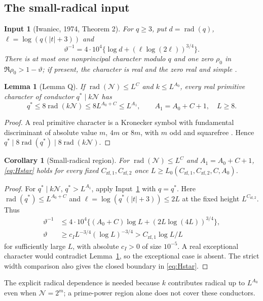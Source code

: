 \documentclass[11pt]{article}
\newtheorem{lemma}[theorem]{Lemma}
\newtheorem{corollary}[theorem]{Corollary}
\newtheorem{inputthm}[theorem]{Input}
\theoremstyle{definition}
\DeclareMathOperator{\rad}{rad}
\newcommand{\GN}{\mathcal N}
\theoremstyle{remark}
\numberwithin{equation}{section}
\begin{document}
\subsection{The small-radical input}\label{subsec:radical}
\begin{inputthm}[Iwaniec, 1974, Theorem 2]\label{input:I}
For $q\ge3$, put $d=\rad(q)$,
$\ell=\log(q(|t|+3))$ and
\begin{equation}\label{eq:Iwaniec}
 \vartheta^{-1}=4\cdot10^4
       \{\log d+(\ell\log(2\ell))^{3/4}\}.
\end{equation}
There is at most one nonprincipal character modulo $q$ and one
zero $\rho_0$ in $\Re\rho_0>1-\vartheta$; if present, the
character is real and the zero real and simple
\cite[Theorem~2, p.~97]{Iwaniec1974}.
\end{inputthm}
\begin{lemma}[Lemma Q]\label{lem:Q}
If $\rad(\GN)\le L^C$ and $k\le L^{A_0}$, every real primitive
character of conductor $q^*\mid k\GN$ has
\begin{equation}\label{eq:Q}
 q^*\le8\rad(k\GN)\le8L^{A_0+C}\le L^{A_1},
 \qquad A_1=A_0+C+1,\quad L\ge8.
\end{equation}
\end{lemma}
\begin{proof}
A real primitive character is a Kronecker symbol with fundamental
discriminant of absolute value $m$, $4m$ or $8m$, with $m$ odd and
squarefree \cite[Chapter~5]{Davenport}. Hence
$q^*\mid8\rad(q^*)\mid8\rad(k\GN)$.
\end{proof}
\begin{corollary}[Small-radical region]\label{cor:small-radical}
For $\rad(\GN)\le L^C$ and $A_1=A_0+C+1$,
\eqref{eq:Hstar} holds for every fixed
$C_{\mathrm{zf},1},C_{\mathrm{zf},2}$ once
$L\ge L_0(C_{\mathrm{zf},1},C_{\mathrm{zf},2},C,A_0)$.
\end{corollary}
\begin{proof}
For $q^*\mid k\GN$, $q^*>L^{A_1}$, apply
Input~\ref{input:I} with $q=q^*$.
Here $\rad(q^*)\le L^{A_0+C}$ and
$\ell=\log(q^*(|t|+3))\le2L$ at the fixed height $L^{C_{\mathrm{zf},2}}$.
Thus
\begin{equation}\label{eq:Iwaniec-width}
 \begin{split}
 \vartheta^{-1}&\le4\cdot10^4
 \{(A_0+C)\log L+(2L\log(4L))^{3/4}\},\\
 \vartheta&\ge c_I L^{-3/4}(\log L)^{-3/4}
       > C_{\mathrm{zf},1}\log L/L
 \end{split}
\end{equation}
for sufficiently large $L$, with absolute $c_I>0$ of size $10^{-5}$.
A real exceptional character would contradict Lemma~\ref{lem:Q},
so the exceptional case is absent. The strict width comparison
also gives the closed boundary in \eqref{eq:Hstar}.
\end{proof}
The explicit radical dependence is needed because $k$ contributes
radical up to $L^{A_0}$ even when $\GN=2^m$; a prime-power region
alone does not cover these conductors.
\end{document}
